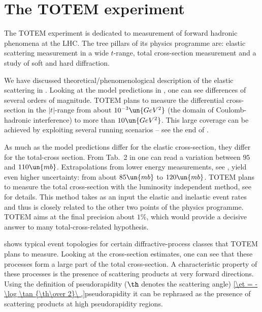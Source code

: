\iffalse
TOTEM, RP, T1, T2, IP, BPM, BLM
\fi

\chapter[ttm]{The TOTEM experiment}



The TOTEM experiment  is dedicated to measurement of forward hadronic phenomena at the LHC. The tree pillars of its physics programme are:
\> elastic scattering measurement in a wide $t$-range,
\> total cross-section measurement and
\> a study of soft and hard diffraction.


We have discussed theoretical/phenomenological description of the elastic scattering in . Looking at the model predictions in , one can see differences of several orders of magnitude. TOTEM plans to measure the differential cross-section in the $|t|$-range from about $10^{-3}\un{GeV^2}$ (the domain of Coulomb-hadronic interference) to more than $10\un{GeV^2}$. This large coverage can be achieved by exploiting several running scenarios -- see the end of . 

As much as the model predictions differ for the elastic cross-section, they differ for the total-cross section. From Tab.~2 in  one can read a variation between $95$ and $110\un{mb}$. Extrapolations from lower energy measurements, see , yield even higher uncertainty: from about $85\un{mb}$ to $120\un{mb}$. TOTEM plans to measure the total cross-section with the luminosity independent method, see  for details. This method takes as an input the elastic and inelastic event rates and thus is closely related to the other two points of the physics programme. TOTEM aims at the final precision about $1\percent$, which would provide a decisive answer to many total-cross-related hypothesis.

 shows typical event topologies for certain diffractive-process classes that TOTEM plans to measure. Looking at the cross-section estimates, one can see that these processes form a large part of the total cross-section. A characteristic property of these processes is the presence of scattering products at very forward directions. Using the definition of pseudorapidity ($\th$ denotes the scattering angle)
\eqref{\et = - \log \tan {\th\over 2}\ ,}{pseudorapidity}
it can be rephrased as the presence of scattering products at high pseudorapidity regions. 

